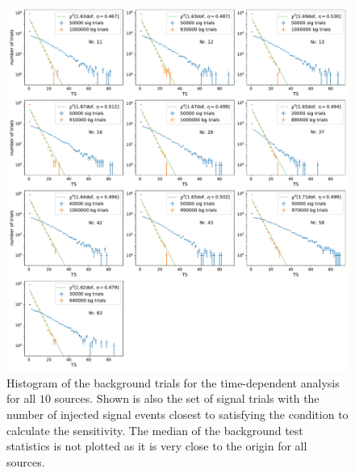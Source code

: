 \begin{figure}
    \centering
    \includegraphics[width=\linewidth]{Plots/appendix/9_years_gfu_gold_time_dep_sig_sens_ts.pdf}
    \caption{Histogram of the background trials for the time-dependent analysis for all $\num{10}$ sources. Shown is also the set of signal trials with the number of injected signal events closest to satisfying the condition to calculate the sensitivity. The median of the background test statistics is not plotted as it is very close to the origin for all sources.}
    \label{fig:time_dep_sig_sens_ts}
\end{figure}

